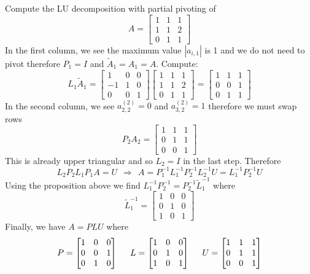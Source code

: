 \begin{example}
Compute the LU decomposition with partial pivoting of
$$
A = \begin{bmatrix} 1 & 1 & 1 \\ 1 & 1 & 2 \\ 0 & 1 & 1 \end{bmatrix}
$$
In the first column, we see the maximum value $| a_{i,1}|$ is 1 and we do not need to pivot therefore $P_1 = I$ and $\tilde{A}_1 = A_1 = A$. Compute:
$$
L_1 \tilde{A}_1 =
\left[ \begin{array}{rrr} 1 & 0 & 0 \\ -1 & 1 & 0 \\ 0 & 0 & 1 \end{array} \right]
\left[ \begin{array}{rrr} 1 & 1 & 1 \\ 1 & 1 & 2 \\ 0 & 1 & 1 \end{array} \right]
=
\left[ \begin{array}{rrr} 1 & 1 & 1 \\ 0 & 0 & 1 \\ 0 & 1 & 1 \end{array} \right]
$$
In the second column, we see $a_{2,2}^{(2)} = 0$ and $a_{3,2}^{(2)} = 1$ therefore we must swap rows
$$
P_2 A_2 = \left[ \begin{array}{rrr} 1 & 1 & 1 \\ 0 & 1 & 1 \\ 0 & 0 & 1 \end{array} \right]
$$
This is already upper triangular and so $L_2 = I$ in the last step. Therefore
$$
L_2 P_2 L_1 P_1 A = U \ \ \Rightarrow \ \ A = P_1^{-1} L_1^{-1} P_2^{-1}L_2^{-1} U = L_1^{-1} P_2^{-1} U
$$
Using the proposition above we find $ L_1^{-1} P_2^{-1} =   P_2^{-1} \tilde{L}_1^{-1}$ where
$$
\tilde{L}_1^{-1} = \left[ \begin{array}{rrr} 1 & 0 & 0 \\ 0 & 1 & 0 \\ 1 & 0 & 1 \end{array} \right]
$$
Finally, we have $A = PLU$ where
$$
P = \begin{bmatrix} 1 & 0 & 0 \\ 0 & 0 & 1 \\ 0 & 1 & 0 \end{bmatrix}
\hspace{5mm}
L = \begin{bmatrix} 1 & 0 & 0 \\ 0 & 1 & 0 \\ 1 & 0 & 1 \end{bmatrix}
\hspace{5mm}
U = \begin{bmatrix} 1 & 1 & 1 \\ 0 & 1 & 1 \\ 0 & 0 & 1 \end{bmatrix}
$$
\end{example}

